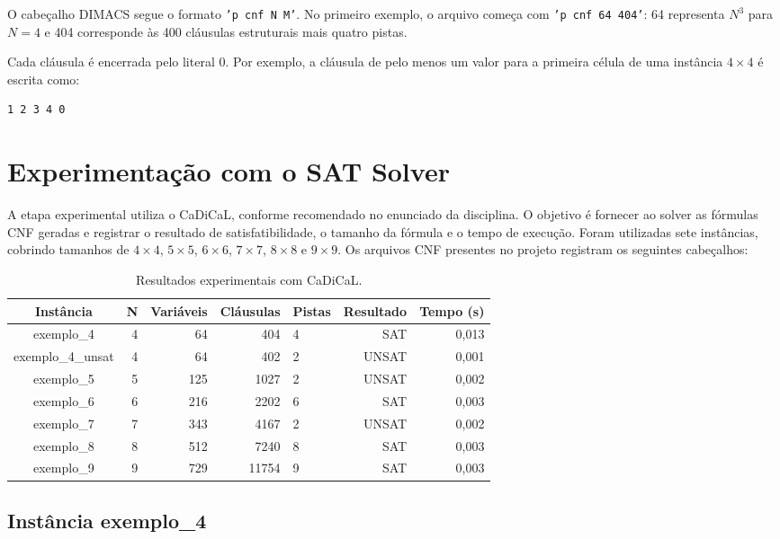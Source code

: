 \documentclass[a4paper, 12pt]{article}
\begin{document}
O cabeçalho DIMACS segue o formato \texttt{'p cnf N M'}. No primeiro exemplo, o arquivo começa com \texttt{'p cnf 64 404'}: 64 representa \(N^3\) para \(N=4\) e 404 corresponde às 400 cláusulas estruturais mais quatro pistas.

Cada cláusula é encerrada pelo literal 0. Por exemplo, a cláusula de pelo menos um valor para a primeira célula de uma instância \(4\times4\) é escrita como:
\begin{verbatim}
1 2 3 4 0
\end{verbatim}

\section{Experimentação com o SAT Solver}

A etapa experimental utiliza o CaDiCaL, conforme recomendado no enunciado da disciplina. O objetivo é fornecer ao solver as fórmulas CNF geradas e registrar o resultado de satisfatibilidade, o tamanho da fórmula e o tempo de execução. Foram utilizadas sete instâncias, cobrindo tamanhos de \(4\times4\), \(5\times5\), \(6\times6\), \(7\times7\), \(8\times8\) e \(9\times9\). Os arquivos CNF presentes no projeto registram os seguintes cabeçalhos:

\begin{table}[H]
\centering
\caption{Resultados experimentais com CaDiCaL.}
\begin{tabular}{c r r r l r r}
\toprule
Instância & N & Variáveis & Cláusulas & Pistas & Resultado & Tempo (s) \\
\midrule
exemplo\_4 & 4 & 64 & 404 & 4 & SAT & 0,013 \\
exemplo\_4\_unsat & 4 & 64 & 402 & 2 & UNSAT & 0,001 \\
exemplo\_5 & 5 & 125 & 1027 & 2 & UNSAT & 0,002 \\
exemplo\_6 & 6 & 216 & 2202 & 6 & SAT & 0,003 \\
exemplo\_7 & 7 & 343 & 4167 & 2 & UNSAT & 0,002 \\
exemplo\_8 & 8 & 512 & 7240 & 8 & SAT & 0,003 \\
exemplo\_9 & 9 & 729 & 11754 & 9 & SAT & 0,003 \\
\bottomrule
\end{tabular}
\end{table}

\subsection{Instância exemplo\_4}
\end{document}
